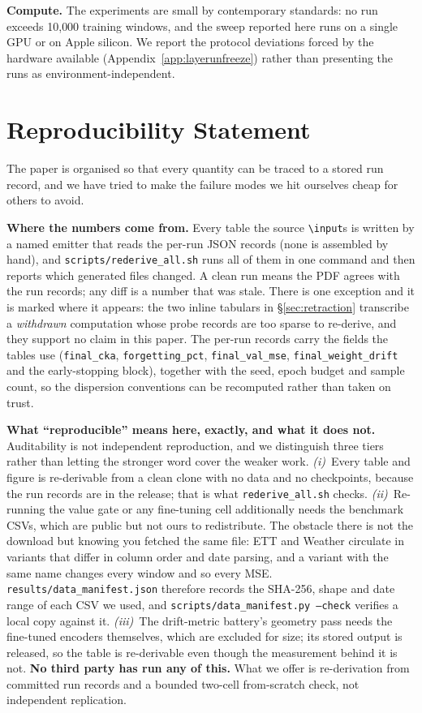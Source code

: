 \textbf{Compute.}  The experiments are small by contemporary standards: no run
exceeds 10{,}000 training windows, and the sweep reported here runs on a single
GPU or on Apple silicon.  We report the protocol deviations forced by the
hardware available (Appendix~\ref{app:layerunfreeze}) rather than presenting the
runs as environment-independent.

\section*{Reproducibility Statement}

The paper is organised so that every quantity can be traced to a stored run
record, and we have tried to make the failure modes we hit ourselves cheap for
others to avoid.

\textbf{Where the numbers come from.}  Every table the source
\texttt{\textbackslash input}s is written by a named emitter that reads the per-run
JSON records (none is assembled by hand), and
\texttt{scripts/rederive\_all.sh} runs all of them in one command and then reports
which generated files changed.  A clean run means the PDF agrees with the run
records; any diff is a number that was stale.  There is one exception and it is
marked where it appears: the two inline tabulars in \S\ref{sec:retraction}
transcribe a \emph{withdrawn} computation whose probe records are too sparse to
re-derive, and they support no claim in this paper.  The per-run records carry the
fields the tables use (\texttt{final\_cka}, \texttt{forgetting\_pct},
\texttt{final\_val\_mse}, \texttt{final\_weight\_drift} and the early-stopping
block), together with the seed, epoch budget and sample count, so the dispersion
conventions can be recomputed rather than taken on trust.

\textbf{What ``reproducible'' means here, exactly, and what it does not.}
Auditability is not independent reproduction, and we distinguish three tiers
rather than letting the stronger word cover the weaker work.  \emph{(i)}~Every
table and figure is re-derivable from a clean clone with no data and no
checkpoints, because the run records are in the release; that is what
\texttt{rederive\_all.sh} checks.  \emph{(ii)}~Re-running the value gate or any
fine-tuning cell additionally needs the benchmark CSVs, which are public but not
ours to redistribute.  The obstacle there is not the download but knowing you
fetched the same file: ETT and Weather circulate in variants that differ in column
order and date parsing, and a variant with the same name changes every window and
so every MSE.  \texttt{results/data\_manifest.json} therefore records the
SHA-256, shape and date range of each CSV we used, and
\texttt{scripts/data\_manifest.py --check} verifies a local copy against it.
\emph{(iii)}~The drift-metric battery's geometry pass needs the fine-tuned
encoders themselves, which are excluded for size; its stored output is released,
so the table is re-derivable even though the measurement behind it is not.
\textbf{No third party has run any of this.}  What we offer is re-derivation from
committed run records and a bounded two-cell from-scratch check, not independent
replication.

